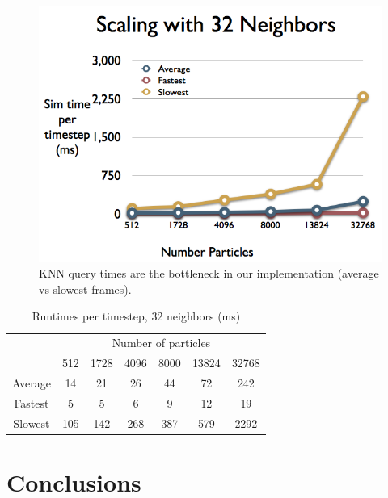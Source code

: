 \documentclass[cameraready]{acmsiggraph-awb}
\begin{document}
\begin{figure}
\begin{centering}
\includegraphics[width = 5in]{Figures/charts_002.png}
\caption{KNN query times are the bottleneck in our implementation (average vs slowest frames).}
\label{fig:scaling2}
\end{centering}
\end{figure}


\begin{table}[htdp]
\caption{Runtimes per timestep, 32 neighbors (ms)}
\begin{center}
\begin{tabular}{ccccccc}
& \multicolumn{6}{c}{Number of particles} \\
& 512 & 1728 & 4096 & 8000 & 13824 & 32768 \\ \hline
Average &14	&21	&26	&44	&72	&242 \\
Fastest & 5&	5&	6	&9	&12	&19 \\
Slowest & 105&	142	&268	&387	&579&	2292\\
\end{tabular}
\end{center}
\label{default}
\end{table}%

\section{Conclusions}
\end{document}
